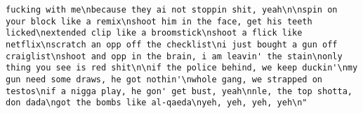\documentclass[]{article}
\begin{document}
\begin{verbatim}
fucking with me\nbecause they ai not stoppin shit, yeah\n\nspin on your block like a remix\nshoot him in the face, get his teeth licked\nextended clip like a broomstick\nshoot a flick like netflix\nscratch an opp off the checklist\ni just bought a gun off craiglist\nshoot and opp in the brain, i am leavin' the stain\nonly thing you see is red shit\n\nif the police behind, we keep duckin'\nmy gun need some draws, he got nothin'\nwhole gang, we strapped on testos\nif a nigga play, he gon' get bust, yeah\nnle, the top shotta, don dada\ngot the bombs like al-qaeda\nyeh, yeh, yeh, yeh\n"                                                                                                                                                                                                                                                                                                                                                                                                                                                                                                                                                                                                                                                                                                                                                                                                                                                                                                                                                                                                                                                                                                                                                                                                                                                                                                                                                                                                                                                                                                                                                                                                                                                                                                                                                                                                                                                                                                                                                                                                                                                                                                                                                                                                                                                                                                                                                                                     

\end{verbatim}
\end{document}
